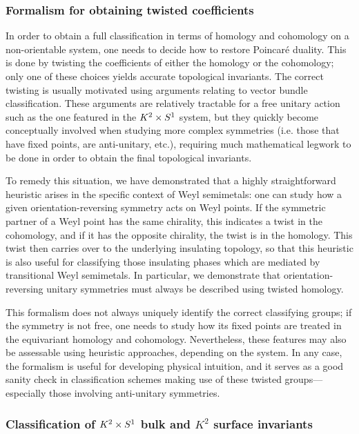\subsubsection{Formalism for obtaining twisted coefficients}

In order to obtain a full classification in terms of homology and cohomology on a non-orientable system, one needs to decide how to restore Poincaré duality. This is done by twisting the coefficients of either the homology or the cohomology; only one of these choices yields accurate topological invariants. The correct twisting is usually motivated using arguments relating to vector bundle classification. These arguments are relatively tractable for a free unitary action such as the one featured in the $K^2\times S^1$ system, but they quickly become conceptually involved when studying more complex symmetries (i.e. those that have fixed points, are anti-unitary, etc.), requiring much mathematical legwork to be done in order to obtain the final topological invariants.

To remedy this situation, we have demonstrated that a highly straightforward heuristic arises in the specific context of Weyl semimetals: one can study how a given orientation-reversing symmetry acts on Weyl points. If the symmetric partner of a Weyl point has the same chirality, this indicates a twist in the cohomology, and if it has the opposite chirality, the twist is in the homology. This twist then carries over to the underlying insulating topology, so that this heuristic is also useful for classifying those insulating phases which are mediated by transitional Weyl semimetals. In particular, we demonstrate that orientation-reversing unitary symmetries must always be described using twisted homology.

This formalism does not always uniquely identify the correct classifying groups; if the symmetry is not free, one needs to study how its fixed points are treated in the equivariant homology and cohomology. Nevertheless, these features may also be assessable using heuristic approaches, depending on the system. In any case, the formalism is useful for developing physical intuition, and it serves as a good sanity check in classification schemes making use of these twisted groups---especially those involving anti-unitary symmetries.

\subsubsection{Classification of $K^2\times S^1$ bulk and $K^2$ surface invariants}


